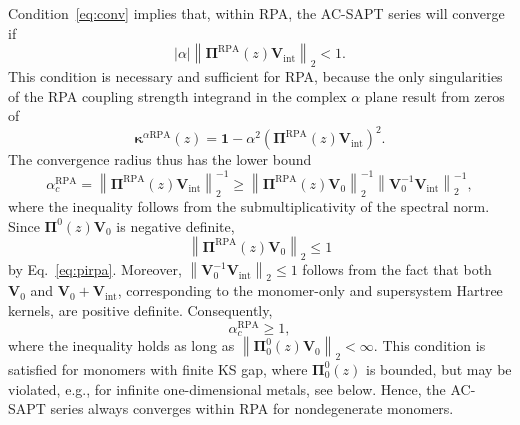 \documentclass[journal=jctcce,manuscript=article]{achemso}
\begin{document}
Condition~\eqref{eq:conv} implies that, within RPA, the AC-SAPT series will
converge if 
\begin{equation}
  |\alpha| \left \| \boldsymbol{\Pi}^\text{RPA}(z)
    \mathbf{V}_{\text{int}} \right\|_2 < 1.
\end{equation}
This condition is necessary and sufficient for RPA, because the only
singularities of the RPA coupling strength integrand in the complex
$\alpha$ plane result from zeros of
\begin{equation}
  \label{eq:kapparpa}
  \boldsymbol{\kappa}^{\alpha\text{RPA}}(z) = \mathbf{1} - \alpha^2
  \left( \boldsymbol{\Pi}^{\text{RPA}}(z)
    \mathbf{V}_{\text{int}}\right)^2.
\end{equation}
The convergence radius thus has the lower bound
\begin{equation}
  \alpha_c^{\text{RPA}} = 
    \left \| \boldsymbol{\Pi}^\text{RPA}(z)
    \mathbf{V}_{\text{int}} \right\|_2^{-1} \geq \left\|
    \boldsymbol{\Pi}^\text{RPA}(z) \mathbf{V}_0 \right\|_2^{-1} 
    \left\|
    \mathbf{V}_0^{-1} \mathbf{V}_\text{int}
    \right\|_2^{-1}, 
\end{equation}
where the inequality follows from the submultiplicativity of the spectral norm.
Since $\boldsymbol{\Pi}^0(z)\mathbf{V}_0$ is negative
definite,
\begin{equation}
  \label{eq:rpabound}
  \left\| 
  \boldsymbol{\Pi}^\text{RPA}(z) \mathbf{V}_0 \right\|_2\leq 1
\end{equation}
by Eq.~\eqref{eq:pirpa}. Moreover, 
$\left\| \mathbf{V}_0^{-1} \mathbf{V}_\text{int}
\right\|_2 \leq 1$ follows \cite{horn199063} from the fact that both
$\mathbf{V}_0$ and $\mathbf{V}_0+\mathbf{V}_{\text{int}}$,
corresponding to the monomer-only and supersystem Hartree kernels, are
positive definite.
Consequently,
\begin{equation}
  \label{eq:alphacrpa}
  \alpha_c^{\text{RPA}} \ge 1,
\end{equation}
where the inequality holds as long as $\left\| 
\boldsymbol{\Pi}^0_0(z) \mathbf{V}_0 \right\|_2 <
\infty$. This condition is satisfied for monomers with finite KS gap,
where $ \boldsymbol{\Pi}^0_0(z)$ is bounded, 
but may be violated, e.g., for infinite one-dimensional metals, see below. 
Hence, the AC-SAPT series always converges within RPA for nondegenerate 
monomers.
\end{document}
